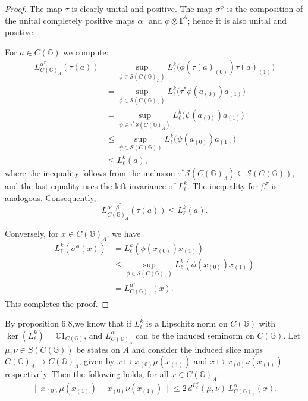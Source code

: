 \documentclass[12pt, reqno]{amsart}
\theoremstyle{definition}
\theoremstyle{remark}
\numberwithin{equation}{section}
\begin{document}
\begin{proof}
    The map $\tau$ is clearly unital and positive. The map $\sigma^\phi$ is the composition of the unital completely positive maps $\alpha^\tau$ and $\phi \otimes \mathbf{I}^A$; hence it is also unital and positive.
    
    For  $a \in C(\mathbb{G})$ we compute:
    \begin{align*}
        L_{C(\mathbb{G})_\Lambda}^{\alpha^{\tau}}(\tau(a))
        &= \sup_{\phi \in \mathcal{S}(C(\mathbb{G})_\Lambda)} L_{\ell}^k\bigl(\phi(\tau(a)_{(0)}) \tau(a)_{(1)}\bigr) \\
        &= \sup_{\phi \in \mathcal{S}(C(\mathbb{G})_\Lambda)} L_{\ell}^k\bigl(\tau^* \phi(a_{(0)}) a_{(1)}\bigr) \\
        &= \sup_{\psi \in \tau^*\mathcal{S}(C(\mathbb{G})_\Lambda)} L_{\ell}^k\bigl(\psi(a_{(0)}) a_{(1)}\bigr) \\
        &\leqslant \sup_{\psi \in \mathcal{S}(C(\mathbb{G}))} L_{\ell}^k\bigl(\psi(a_{(0)}) a_{(1)}\bigr)\\
        &\leqslant L_{\ell}^k(a),
    \end{align*}
    where the inequality follows from the inclusion $\tau^*\mathcal{S}(C(\mathbb{G})_\Lambda) \subseteq \mathcal{S}(C(\mathbb{G}))$, and the last equality uses the left invariance of $L_\ell^k$. The inequality for $\beta^\tau$ is analogous. Consequently,
    \[
        L_{C(\mathbb{G})_\Lambda}^{\alpha^{\tau},\beta^{\tau}}(\tau(a)) \leq L_\ell^k(a).
    \]
    
    Conversely, for $x \in C(\mathbb{G})_\Lambda$, we have
    \begin{align*}
        L_\ell^k(\sigma^\phi(x))
        &= L_\ell^k(\phi(x_{(0)}) x_{(1)}) \\
        &\leq \sup_{\phi \in \mathcal{S}(C(\mathbb{G})_\Lambda)} L_\ell^k(\phi(x_{(0)}) x_{(1)}) \\
        &= L_{C(\mathbb{G})_\Lambda}^{\alpha^{\tau}}(x).
    \end{align*}
    This completes the proof.
\end{proof}

By \cite{6} proposition 6.8,we know that if \( L_\ell^k \) is a Lipschitz norm on \( C(\mathbb{G}) \) with \( \ker(L_\ell^k) = \mathbb{C}1_{ C(\mathbb{G})} \), and $L_{C(\mathbb{G})_\Lambda}^\alpha$  can be  the induced seminorm on $C(\mathbb{G})$. Let \( \mu, \nu \in S(C(\mathbb{G})) \) be states on \( A \) and consider the induced slice maps \( C(\mathbb{G})_\Lambda \to C(\mathbb{G})_\Lambda \), given by \( x \mapsto x_{(0)}\mu(x_{(1)}) \) and \( x \mapsto x_{(0)}\nu(x_{(1)}) \) respectively. Then the following holds, for all \( x \in C(\mathbb{G})_\Lambda \):
\[
\| x_{(0)}\mu(x_{(1)}) - x_{(0)}\nu(x_{(1)}) \| \leq 2 \, d^{L_\ell^k}(\mu, \nu) \, L_{C(\mathbb{G})_\Lambda}^\alpha(x).
\]
\end{document}
